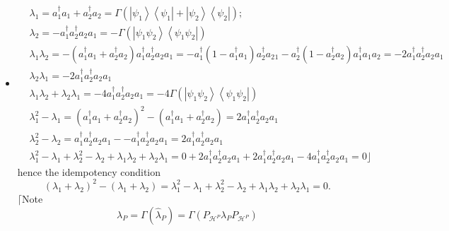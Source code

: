 \documentclass[aps,preprint]{revtex4}%
\begin{document}
\begin{itemize}
\item
\begin{align}
&  \lambda_{1}=a_{1}^{\dagger}a_{1}+a_{2}^{\dagger}a_{2}=\Gamma\left(
\left\vert \psi_{1}\right\rangle \left\langle \psi_{1}\right\vert +\left\vert
\psi_{2}\right\rangle \left\langle \psi_{2}\right\vert \right)  ;\nonumber\\
&  \lambda_{2}=-a_{1}^{\dagger}a_{2}^{\dagger}a_{2}a_{1}=-\Gamma\left(
\left\vert \psi_{1}\psi_{2}\right\rangle \left\langle \psi_{1}\psi
_{2}\right\vert \right) \nonumber\\
&  \lambda_{1}\lambda_{2}=-\left(  a_{1}^{\dagger}a_{1}+a_{2}^{\dagger}%
a_{2}\right)  a_{1}^{\dagger}a_{2}^{\dagger}a_{2}a_{1}=-a_{1}^{\dagger}\left(
1-a_{1}^{\dagger}a_{1}\right)  a_{2}^{\dagger}a_{2}{}_{1}-a_{2}^{\dagger
}\left(  1-a_{2}^{\dagger}a_{2}\right)  a_{1}^{\dagger}a_{1}a_{2}%
=-2a_{1}^{\dagger}a_{2}^{\dagger}a_{2}a_{1}\nonumber\\
&  \lambda_{2}\lambda_{1}=-2a_{1}^{\dagger}a_{2}^{\dagger}a_{2}a_{1}%
\nonumber\\
&  \lambda_{1}\lambda_{2}+\lambda_{2}\lambda_{1}=-4a_{1}^{\dagger}%
a_{2}^{\dagger}a_{2}a_{1}=-4\Gamma\left(  \left\vert \psi_{1}\psi
_{2}\right\rangle \left\langle \psi_{1}\psi_{2}\right\vert \right) \nonumber\\
&  \lambda_{1}^{2}-\lambda_{1}=\left(  a_{1}^{\dagger}a_{1}+a_{2}^{\dagger
}a_{2}\right)  ^{2}-\left(  a_{1}^{\dagger}a_{1}+a_{2}^{\dagger}a_{2}\right)
=2a_{1}^{\dagger}a_{2}^{\dagger}a_{2}a_{1}\nonumber\\
&  \lambda_{2}^{2}-\lambda_{2}=a_{1}^{\dagger}a_{2}^{\dagger}a_{2}a_{1}%
--a_{1}^{\dagger}a_{2}^{\dagger}a_{2}a_{1}=2a_{1}^{\dagger}a_{2}^{\dagger
}a_{2}a_{1}\nonumber\\
&  \lambda_{1}^{2}-\lambda_{1}+\lambda_{2}^{2}-\lambda_{2}+\lambda_{1}%
\lambda_{2}+\lambda_{2}\lambda_{1}=0+2a_{1}^{\dagger}a_{2}^{\dagger}a_{2}%
a_{1}+2a_{1}^{\dagger}a_{2}^{\dagger}a_{2}a_{1}-4a_{1}^{\dagger}a_{2}%
^{\dagger}a_{2}a_{1}=0\rfloor
\end{align}
hence the idempotency condition%
\begin{equation}
\left(  \lambda_{1}+\lambda_{2}\right)  ^{2}-\left(  \lambda_{1}+\lambda
_{2}\right)  =\lambda_{1}^{2}-\lambda_{1}+\lambda_{2}^{2}-\lambda_{2}%
+\lambda_{1}\lambda_{2}+\lambda_{2}\lambda_{1}=0.
\end{equation}
$\lceil$Note
\begin{equation}
\lambda_{P}=\Gamma\left(  \hat{\lambda}_{P}\right)  =\Gamma\left(
P_{\mathcal{H}^{P}}\lambda_{P}P_{\mathcal{H}^{P}}\right)

\end{equation}
\end{itemize}
\end{document}
